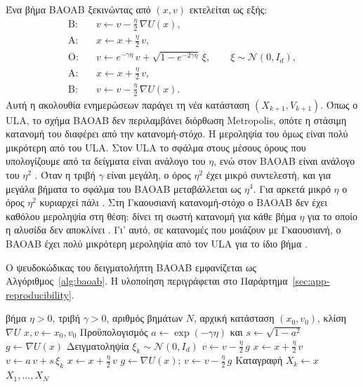 Ένα βήμα BAOAB ξεκινώντας από $(x, v)$ εκτελείται ως εξής:
\begin{align}
  \text{B}:\quad & v \leftarrow v - \tfrac{\eta}{2}\, \nabla U(x), \\
  \text{A}:\quad & x \leftarrow x + \tfrac{\eta}{2}\, v, \\
  \text{O}:\quad & v \leftarrow e^{-\gamma \eta}\, v + \sqrt{1 - e^{-2\gamma\eta}}\, \xi, \qquad \xi \sim \mathcal{N}(0, I_d), \\
  \text{A}:\quad & x \leftarrow x + \tfrac{\eta}{2}\, v, \\
  \text{B}:\quad & v \leftarrow v - \tfrac{\eta}{2}\, \nabla U(x).
\end{align}
Αυτή η ακολουθία ενημερώσεων παράγει τη νέα κατάσταση $(X_{k+1}, V_{k+1})$.
Όπως ο ULA, το σχήμα BAOAB δεν περιλαμβάνει διόρθωση Metropolis, οπότε η στάσιμη
κατανομή του διαφέρει από την κατανομή-στόχο. Η μεροληψία του όμως είναι πολύ
μικρότερη από του ULA. Στον ULA το σφάλμα στους μέσους όρους που υπολογίζουμε από
τα δείγματα είναι ανάλογο του $\eta$, ενώ στον BAOAB είναι ανάλογο του $\eta^2$
\citep{leimkuhler2013bao}. Όταν η τριβή $\gamma$ είναι μεγάλη, ο όρος $\eta^2$ έχει
μικρό συντελεστή, και για μεγάλα βήματα το σφάλμα του BAOAB μεταβάλλεται ως $\eta^4$.
Για αρκετά μικρό $\eta$ ο όρος $\eta^2$ κυριαρχεί πάλι \citep{leimkuhler2013rational}. Στη Γκαουσιανή κατανομή-στόχο ο
BAOAB δεν έχει καθόλου μεροληψία στη θέση: δίνει τη σωστή κατανομή για κάθε βήμα
$\eta$ για το οποίο η αλυσίδα δεν αποκλίνει \citep{leimkuhler2013bao}. Γι' αυτό, σε
κατανομές που μοιάζουν με Γκαουσιανή, ο BAOAB έχει πολύ μικρότερη μεροληψία από τον
ULA για το ίδιο βήμα \citep{leimkuhler2013rational}.

Ο ψευδοκώδικας του δειγματολήπτη BAOAB εμφανίζεται ως Αλγόριθμος~\ref{alg:baoab}.
Η υλοποίηση περιγράφεται στο Παράρτημα~\ref{sec:app-reproducibility}.

\begin{algorithm}[ht]
\caption{Ολοκληρωτής BAOAB για underdamped Langevin}
\label{alg:baoab}
\begin{algorithmic}[1]
\Require βήμα $\eta>0$, τριβή $\gamma > 0$, αριθμός βημάτων $N$, αρχική κατάσταση $(x_0, v_0)$, κλίση $\nabla U$
\State $x, v \gets x_0, v_0$
\State Προϋπολογισμός $a \gets \exp(-\gamma \eta)$ και $s \gets \sqrt{1 - a^2}$
\State $g \gets \nabla U(x)$
  \State Δειγματοληψία $\xi_k \sim \mathcal{N}(0, I_d)$
  \State $v \gets v - \tfrac{\eta}{2}\, g$ 
  \State $x \gets x + \tfrac{\eta}{2}\, v$ 
  \State $v \gets a\, v + s\, \xi_k$ 
  \State $x \gets x + \tfrac{\eta}{2}\, v$ 
  \State $g \gets \nabla U(x)$; \quad $v \gets v - \tfrac{\eta}{2}\, g$ 
  \State Καταγραφή $X_k \gets x$
\EndFor
\State \Return $X_1, \ldots, X_N$
\end{algorithmic}
\end{algorithm}


